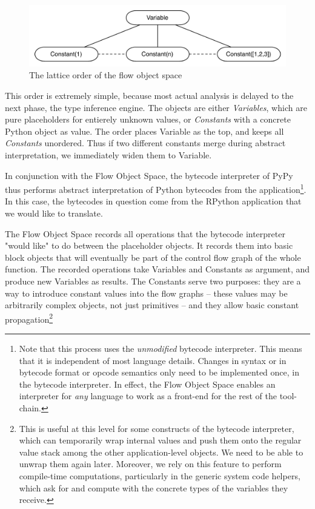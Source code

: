 \documentclass{acm_proc_article-sp}
\begin{document}
\begin{figure}
\centering
\includegraphics[scale=0.75]{image/flowlattice.pdf}
\caption{The lattice order of the flow object space}
\label{flowlattice}
\end{figure}

This order is extremely simple, because most actual analysis is delayed
to the next phase, the type inference engine.  The objects are either
\textit{Variables}, which are pure placeholders for entierely unknown values,
or \textit{Constants} with a concrete Python object as value.  The order places
Variable as the top, and keeps all \textit{Constants} unordered.  Thus if two
different constants merge during abstract interpretation, we immediately
widen them to Variable.

In conjunction with the Flow Object Space, the bytecode interpreter of
PyPy thus performs abstract interpretation of Python bytecodes from
the application\footnote{Note that this process uses the
\textit{unmodified} bytecode interpreter.  This means that it is
independent of most language details.  Changes in syntax or in
bytecode format or opcode semantics only need to be implemented once,
in the bytecode interpreter.  In effect, the Flow Object Space enables
an interpreter for \textit{any} language to work as a front-end for
the rest of the tool-chain.}.  In this case, the bytecodes in
question come from the RPython application that we would like to
translate.

The Flow Object Space records all operations that the bytecode
interpreter "would like" to do between the placeholder objects.  It
records them into basic block objects that will eventually be part of
the control flow graph of the whole function.  The recorded operations
take Variables and Constants as argument, and produce new Variables as
results.  The Constants serve two purposes: they are a way to
introduce constant values into the flow graphs -- these values may be
arbitrarily complex objects, not just primitives -- and they allow
basic constant propagation\footnote{This is useful at this level for
some constructs of the bytecode interpreter, which can temporarily
wrap internal values and push them onto the regular value stack among
the other application-level objects.  We need to be able to unwrap
them again later.  Moreover, we rely on this feature to perform
compile-time computations, particularly in the generic system code
helpers, which ask for and compute with the concrete types of the
variables they receive.}
\end{document}
